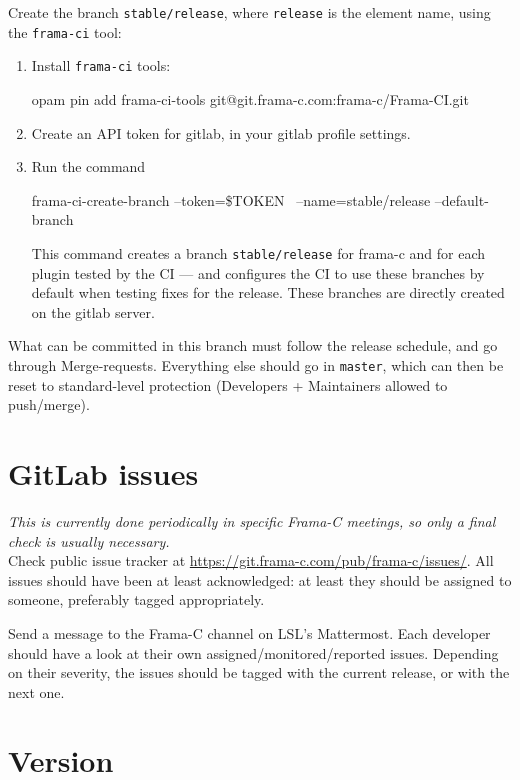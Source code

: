 Create the branch \texttt{stable/release}, where \texttt{release} is the
element name, using the \texttt{frama-ci} tool:
\begin{enumerate}
\item Install \texttt{frama-ci} tools:
\begin{shell}
opam pin add frama-ci-tools git@git.frama-c.com:frama-c/Frama-CI.git
\end{shell}
\item Create an API token for gitlab, in your gitlab profile settings.
\item Run the command
\begin{shell}
frama-ci-create-branch --token=\$TOKEN \
--name=stable/release --default-branch
\end{shell}
This command creates a branch \texttt{stable/release} for frama-c and for
each plugin tested by the CI — and configures the CI to use these branches
by default when testing fixes for the release.
These branches are directly created on the gitlab server.
\end{enumerate}
What can be committed in this branch must follow the release schedule,
and go through Merge-requests. Everything else should go in \texttt{master},
which can then be reset to standard-level protection (Developers + Maintainers
allowed to push/merge).

\section{GitLab issues}

{\em This is currently done periodically in specific Frama-C meetings, so only
  a final check is usually necessary.}~\\

Check public issue tracker at \url{https://git.frama-c.com/pub/frama-c/issues/}.
All issues should have been at least acknowledged: at least they should be
assigned to someone, preferably tagged appropriately.

Send a message to the Frama-C channel on LSL's Mattermost. Each developer should
have a look at their own assigned/monitored/reported issues. Depending on their
severity, the issues should be tagged with the current release, or with the next
one.

\section{Version}


